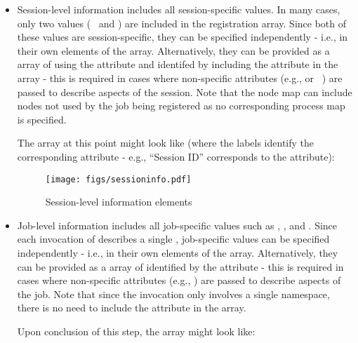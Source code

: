 \begin{itemize}
\item Session-level information includes all session-specific values. In many cases, only two values (~ and ) are included in the registration array. Since both of these values are session-specific, they can be specified independently - i.e., in their own  elements of the  array. Alternatively, they can be provided as a  array of  using the  attribute and identifed by including the  attribute in the array - this is required in cases where non-specific attributes (e.g.,  or ~) are passed to describe aspects of the session. Note that the node map can include nodes not used by the job being registered as no corresponding process map is specified.

The  array at this point might look like (where the labels identify the corresponding attribute - e.g., ``Session ID'' corresponds to the  attribute):

\begingroup
\begin{figure*}[ht!]
  \begin{center}
    \texttt{[image: figs/sessioninfo.pdf]}
  \end{center}
  \caption{Session-level information elements}
  \label{fig:sessioninfo}
\end{figure*}
\endgroup


\item Job-level information includes all job-specific values such as , , and . Since each invocation of  describes a single , job-specific values can be specified independently - i.e., in their own  elements of the  array. Alternatively, they can be provided as a  array of  identified by the  attribute - this is required in cases where non-specific attributes (e.g., ) are passed to describe aspects of the job. Note that since the invocation only involves a single namespace, there is no need to include the  attribute in the array.

Upon conclusion of this step, the  array might look like:


\end{itemize}
